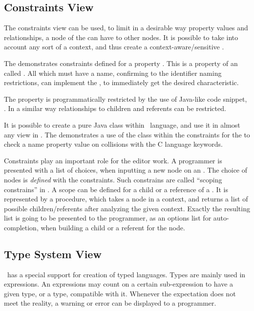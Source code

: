 \subsection{Constraints View}
\label{mpsconstraints}


The constraints view can be used, to limit in a desirable way  property values and relationships, a node of the  can 
have to other nodes. It is possible to take into account any sort of a context, and thus create a context-aware/sensitive .

The  demonstrates constraints defined for a property . This is a property of an 
 called . All  which must have a name, confirming to the identifier naming restrictions, can implement the ,
to immediately get the desired characteristic.

The  property is programmatically restricted by the use of Java-like code snippet, . In a similar way
relationships to children and referents can be restricted.

It is possible to create a pure Java class within \jbmps\ language, and use it in almost any  view in \jbmps. 
The  demonstrates a use of the  class within the constraints for the 
 to check a name property value on collisions with the C language keywords.

Constraints play an important role for the editor work. A programmer is presented with a list of choices, when inputting
a new node on an . The choice of nodes is \emph{defined} with the constraints. Such constrains are called ``scoping constrains'' in 
\jbmps. A scope can be defined for a child or a reference of a . It is represented by a procedure, which takes a node 
in a context, and returns a list of possible children/referents after analyzing the given context. 
Exactly the resulting list is going to be presented to the programmer, as an options list for auto-completion, when building 
a child or a referent for the node.

\subsection{Type System View}
\label{mpsts}
\jbmps\ has a special support for creation of typed languages. Types are mainly used in expressions. An expressions may count on 
a certain sub-expression to have a given type, or a type, compatible with it. Whenever the expectation does not meet the reality,
a warning or error can be displayed to a programmer. 

